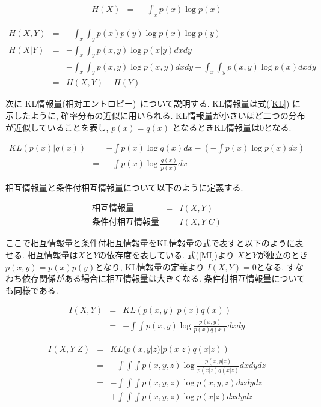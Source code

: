 \documentclass[a4paper]{jarticle}
\begin{document}
\begin{eqnarray}
\label{entropy}
H(X) &=& - \int_x p(x) \log p(x) 
\end{eqnarray}

\begin{eqnarray}
\label{jointentropy}
H(X, Y) &=& - \int_x \int_y p(x) p(y) \log p(x) \log p(y) \\
\label{conditionalentropy}
H(X| Y) &=& - \int_x \int_y p(x, y) \log p(x| y) dx dy \nonumber \\
           &=& - \int_x \int_y p(x, y) \log p(x, y) dx dy + \int_x \int_y p(x, y) \log p(x) dx dy \nonumber \\
           &=& H(X, Y) - H(Y)
\end{eqnarray}


次に KL情報量(相対エントロピー)~\cite{Meyer}について説明する. KL情報量は式(\ref{KL}) に示したように, 確率分布の近似に用いられる. KL情報量が小さいほど二つの分布が近似していることを表し, $p(x) = q(x)$ となるときKL情報量は$0$となる.

\begin{eqnarray}
\label{KL}
KL(p(x) | q(x)) &=& - \int p(x) \log q(x) dx - \left(- \int p(x) \log p(x) dx \right) \nonumber \\ 
                    &=& - \int p(x) \log \frac{q(x)}{p(x)} dx
\end{eqnarray}

相互情報量と条件付相互情報量について以下のように定義する.

\begin{eqnarray*}
\mbox{相互情報量} &=& I(X, Y) \\
\mbox{条件付相互情報量} &=& I(X, Y | C)
\end{eqnarray*}

ここで相互情報量と条件付相互情報量をKL情報量の式で表すと以下のように表せる. 相互情報量は$X$と$Y$の依存度を表している. 式(\ref{MI})より $X$と$Y$が独立のとき$p(x, y) = p(x) p(y)$となり, KL情報量の定義より $I(X, Y) = 0$となる. すなわち依存関係がある場合に相互情報量は大きくなる. 条件付相互情報量についても同様である. 

\begin{eqnarray}
\label{MI}
I(X, Y) &=& KL(p(x, y) | p(x) q(x)) \nonumber \\
          &=& - \int \int p(x, y) \log \frac{p(x, y)}{p(x) q(x)} dx dy 
\end{eqnarray}

\begin{eqnarray}
\label{CMI}
I(X, Y | Z) &=&  KL(p(x, y| z) | p(x|z) q(x|z)) \nonumber \\
              &=& - \int \int \int p(x, y, z) \log \frac{p(x, y|z)}{p(x|z) q(x|z)} dx dy dz \nonumber \\
               &=& - \int \int \int p(x, y, z) \log p(x, y, z) dx dy dz  \nonumber \\
                &&+ \int \int \int p(x, y, z) \log p(x| z) dx dy dz 
\end{eqnarray}
\end{document}
